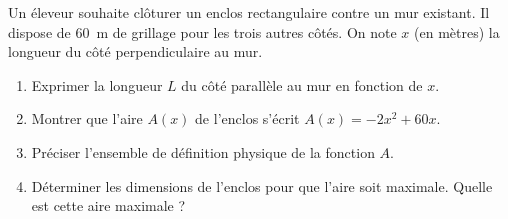 \documentclass[11pt]{article}
\begin{document}
\begin{exercice}
Un éleveur souhaite clôturer un enclos rectangulaire contre un mur existant. Il dispose de \SI{60}{\meter} de grillage pour les trois autres côtés. On note $x$ (en mètres) la longueur du côté perpendiculaire au mur.
\begin{enumerate}
    \item Exprimer la longueur $L$ du côté parallèle au mur en fonction de $x$.
    \item Montrer que l'aire $A(x)$ de l'enclos s'écrit $A(x) = -2x^2 + 60x$.
    \item Préciser l'ensemble de définition physique de la fonction $A$.
    \item Déterminer les dimensions de l'enclos pour que l'aire soit maximale. Quelle est cette aire maximale ?
\end{enumerate}
\end{exercice}
\end{document}
